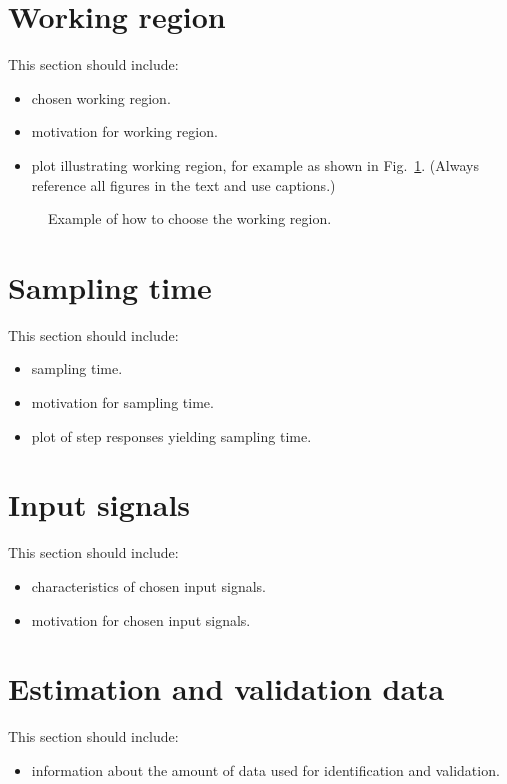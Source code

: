 \documentclass[10pt,a4paper]{article}
\begin{document}
\section{Working region}
This section should include:
\begin{itemize}
    \item chosen working region.
    \item motivation for working region.
    \item plot illustrating working region, for example as shown in Fig.~\ref{fig:workingRegion}. (Always reference all figures in the text and use captions.)
\end{itemize}
%
\begin{figure}[ht]
\footnotesize
\centering 
\def\svgwidth{.8\columnwidth}
 
\caption{Example of how to choose the working region.}
\label{fig:workingRegion}
\end{figure}

\section{Sampling time}
This section should include:
\begin{itemize}
    \item sampling time.
    \item motivation for sampling time.
    \item plot of step responses yielding sampling time.
\end{itemize}

\section{Input signals}
This section should include:
\begin{itemize}
    \item characteristics of chosen input signals.
    \item motivation for chosen input signals.
\end{itemize}

\section{Estimation and validation data}
This section should include:
\begin{itemize}
    \item information about the amount of data used for identification and validation.
\end{itemize}
\end{document}
